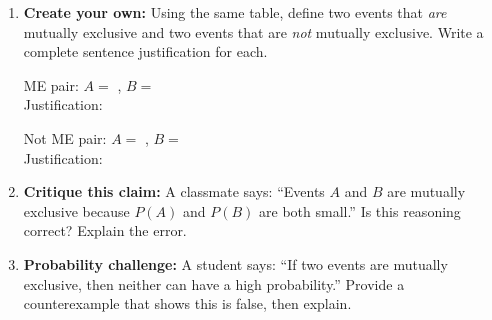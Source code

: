 \documentclass[10pt]{article}
\begin{document}
\vspace{0.1in}

\begin{tcolorbox}[colback=goldbg, colframe=goldacc, boxrule=0.9pt, arc=2mm,
    left=3mm, right=3mm, top=2mm, bottom=2mm,
    title={\bfseries\small Tier E --- Extension: Creating and Critiquing},
    fonttitle=\small]
\small
\begin{enumerate}[leftmargin=1.5em, itemsep=10pt]
  \item \textbf{Create your own:} Using the same table, define two events that \emph{are}
        mutually exclusive and two events that are \emph{not} mutually exclusive.
        Write a complete sentence justification for each.

        \vspace{4pt}
        ME pair: $A = $ \blank{5cm}, $B = $ \blank{5cm}\\
        Justification: \writeline\writeline

        \vspace{4pt}
        Not ME pair: $A = $ \blank{5cm}, $B = $ \blank{5cm}\\
        Justification: \writeline\writeline

  \item \textbf{Critique this claim:} A classmate says: ``Events $A$ and $B$ are
        mutually exclusive because $P(A)$ and $P(B)$ are both small.''
        Is this reasoning correct? Explain the error.\\
        \writeline\writeline\writeline

  \item \textbf{Probability challenge:} A student says: ``If two events are mutually exclusive,
        then neither can have a high probability.'' Provide a counterexample that shows this
        is false, then explain.\\
        \writeline\writeline\writeline
\end{enumerate}
\end{tcolorbox}
\end{document}
